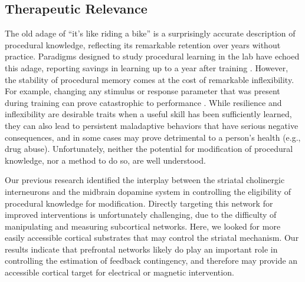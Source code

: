\documentclass[man,apacite,draftfirst]{apa6} \usepackage{amsmath}
\begin{document}
\subsection*{Therapeutic Relevance} The old adage of ``it's like riding a bike''
is a surprisingly accurate description of procedural knowledge, reflecting its
remarkable retention over years without practice. Paradigms designed to study
procedural learning in the lab have echoed this adage, reporting savings in
learning up to a year after training \cite{Romano2010, turner_long-term_2012}.
However, the stability of procedural memory comes at the cost of remarkable
inflexibility. For example, changing any stimulus or response parameter that was
present during training can prove catastrophic to performance
\cite{Rozanov_2010, Dienes_1997}. While resilience and inflexibility are
desirable traits when a useful skill has been sufficiently learned, they can
also lead to persistent maladaptive behaviors that have serious negative
consequences, and in some cases may prove detrimental to a person's health
(e.g., drug abuse). Unfortunately, neither the potential for modification of
procedural knowledge, nor a method to do so, are well understood.

Our previous research identified the interplay between the striatal cholinergic
interneurons and the midbrain dopamine system in controlling the eligibility of
procedural knowledge for modification. Directly targeting this network for
improved interventions is unfortunately challenging, due to the difficulty of
manipulating and measuring subcortical networks. Here, we looked for more easily
accessible cortical substrates that may control the striatal mechanism. Our
results indicate that prefrontal networks likely do play an important role in
controlling the estimation of feedback contingency, and therefore may provide an
accessible cortical target for electrical or magnetic intervention.


\end{document}
